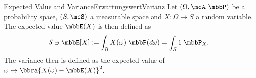 \begin{mdef}{Expected Value and Variance}{ErwartungswertVarianz}
    Let $(\Omega,\mcA,\mbbP)$ be a probability space, $(S,\mcS)$ a measurable space and $X:\Omega\to S$ a random variable. The expected value $\mbbE(X)$ is then defined as
    \[
        S\ni\mbbE[X] := \int_{\Omega} X(\omega)\;\mbbP(d\omega) = \int_{S}1\;\mbbP_X.
    \]
    The variance then is defined as the expected value of $\omega\mapsto \bbra{X(\omega) - \mbbE(X)}^2$.
\end{mdef}